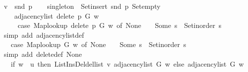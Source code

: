 \begin{isabellebody}
\ {\isacharquery}{\kern0pt}v\ {\isacharequal}{\kern0pt}\ {\isachardoublequoteopen}snd\ p{\isachardoublequoteclose}\isanewline
\ \ \isamarkupfalse%
\ {\isacharquery}{\kern0pt}singleton\ {\isacharequal}{\kern0pt}\ {\isachardoublequoteopen}Set{\isacharunderscore}{\kern0pt}insert\ {\isacharparenleft}{\kern0pt}snd\ p{\isacharparenright}{\kern0pt}\ Set{\isacharunderscore}{\kern0pt}empty{\isachardoublequoteclose}\isanewline
\ \ \isamarkupfalse%
\isanewline
\ \ \ \ {\isachardoublequoteopen}adjacency{\isacharunderscore}{\kern0pt}list\ {\isacharparenleft}{\kern0pt}delete\ p\ G{\isacharparenright}{\kern0pt}\ w\ {\isacharequal}{\kern0pt}\isanewline
\ \ \ \ \ {\isacharparenleft}{\kern0pt}case\ Map{\isacharunderscore}{\kern0pt}lookup\ {\isacharparenleft}{\kern0pt}delete\ p\ G{\isacharparenright}{\kern0pt}\ w\ of\ None\ {\isasymRightarrow}\ {\isacharbrackleft}{\kern0pt}{\isacharbrackright}{\kern0pt}\ {\isacharbar}{\kern0pt}\ Some\ s\ {\isasymRightarrow}\ Set{\isacharunderscore}{\kern0pt}inorder\ s{\isacharparenright}{\kern0pt}{\isachardoublequoteclose}\isanewline
\ \ \ \ \isamarkupfalse%
\ {\isacharparenleft}{\kern0pt}simp\ add{\isacharcolon}{\kern0pt}\ adjacency{\isacharunderscore}{\kern0pt}list{\isacharunderscore}{\kern0pt}def{\isacharparenright}{\kern0pt}\isanewline
\ \ \isamarkupfalse%
\ \isamarkupfalse%
\ {\isachardoublequoteopen}{\isachardot}{\kern0pt}{\isachardot}{\kern0pt}{\isachardot}{\kern0pt}\ {\isacharequal}{\kern0pt}\ {\isacharparenleft}{\kern0pt}case\ Map{\isacharunderscore}{\kern0pt}lookup\ G\ w\ of\ None\ {\isasymRightarrow}\ {\isacharbrackleft}{\kern0pt}{\isacharbrackright}{\kern0pt}\ {\isacharbar}{\kern0pt}\ Some\ s\ {\isasymRightarrow}\ Set{\isacharunderscore}{\kern0pt}inorder\ s{\isacharparenright}{\kern0pt}{\isachardoublequoteclose}\isanewline
\ \ \ \ \isamarkupfalse%
\ {\isacharparenleft}{\kern0pt}simp\ add{\isacharcolon}{\kern0pt}\ delete{\isacharunderscore}{\kern0pt}def\ None{\isacharparenright}{\kern0pt}\isanewline
\ \ \isamarkupfalse%
\ \isamarkupfalse%
\ {\isachardoublequoteopen}{\isachardot}{\kern0pt}{\isachardot}{\kern0pt}{\isachardot}{\kern0pt}\ {\isacharequal}{\kern0pt}\ {\isacharparenleft}{\kern0pt}if\ w\ {\isacharequal}{\kern0pt}\ {\isacharquery}{\kern0pt}u\ then\ List{\isacharunderscore}{\kern0pt}Ins{\isacharunderscore}{\kern0pt}Del{\isachardot}{\kern0pt}del{\isacharunderscore}{\kern0pt}list\ {\isacharquery}{\kern0pt}v\ {\isacharparenleft}{\kern0pt}adjacency{\isacharunderscore}{\kern0pt}list\ G\ w{\isacharparenright}{\kern0pt}\ else\ adjacency{\isacharunderscore}{\kern0pt}list\ G\ w{\isacharparenright}{\kern0pt}{\isachardoublequoteclose}\isanewline

\end{isabellebody}
